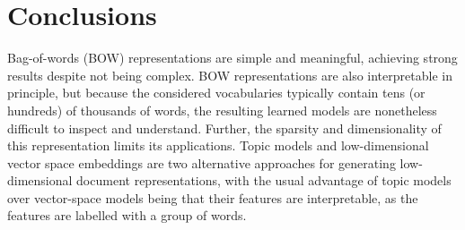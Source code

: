{%






\section{Conclusions}

 Bag-of-words (BOW) representations are simple and meaningful, achieving strong results despite not being complex. BOW representations are also interpretable in principle, but because the considered vocabularies typically contain tens (or hundreds) of thousands of words, the resulting learned models are nonetheless difficult to inspect and understand. Further, the sparsity and dimensionality of this representation limits its applications. Topic models and low-dimensional vector space embeddings are two alternative approaches for generating low-dimensional document representations, with the usual advantage of topic models over vector-space models being that their features are interpretable, as the features are labelled with a group of words. %

}

